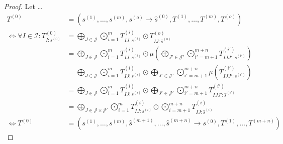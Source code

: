 \begin{proof}
    Let \dots
    \begin{align*}
        T^{(0)}                                              & = (s^{(1)},\dots,s^{(m)}, s^{(o)} \rightarrow \hat{s}^{(0)}, T^{(1)},\dots,T^{(m)}, T^{(o)})                                                                                                                       \\
        \iff \forall I \in \mathcal{I}: T^{(0)}_{I: s^{(0)}} & = \bigoplus\limits_{J \in \mathcal{J}} \bigodot\limits_{i = 1}^{m} T^{(i)}_{IJ:s^{(i)}} \odot T^{(o)}_{IJ:\hat{s}^{(o)}}                                                                                           \\
                                                             & = \bigoplus\limits_{J \in \mathcal{J}} \bigodot\limits_{i = 1}^{m} T^{(i)}_{IJ:s^{(i)}} \odot \mu\left(\bigoplus\limits_{J' \in \mathcal{J}'} \bigodot\limits_{i' = m + 1}^{m + n} T^{(i')}_{IJJ':s^{(i')}}\right) \\
                                                             & = \bigoplus\limits_{J \in \mathcal{J}} \bigodot\limits_{i = 1}^{m} T^{(i)}_{IJ:s^{(i)}} \odot \bigoplus\limits_{J' \in \mathcal{J}'} \bigodot\limits_{i' = m + 1}^{m + n} \mu\left(T^{(i')}_{IJJ':s^{(i')}}\right) \\
                                                             & = \bigoplus\limits_{J \in \mathcal{J}} \bigodot\limits_{i = 1}^{m} T^{(i)}_{IJ:s^{(i)}} \odot \bigoplus\limits_{J' \in \mathcal{J}'} \bigodot\limits_{i' = m + 1}^{m + n} T^{(i')}_{IJJ':\hat{s}^{(i')}}           \\
                                                             & = \bigoplus\limits_{J \in \mathcal{J} \times \mathcal{J}'} \bigodot\limits_{i = 1}^{m} T^{(i)}_{IJ:s^{(i)}} \odot \bigodot\limits_{i = m + 1}^{m + n} T^{(i)}_{IJ:\hat{s}^{(i)}}                                   \\
        \iff T^{(0)}                                         & = (s^{(1)},\dots,s^{(m)}, \hat{s}^{(m + 1)}, \dots, \hat{s}^{(m + n)} \rightarrow s^{(0)}, T^{(1)},\dots,T^{(m + n)})
    \end{align*}
\end{proof}
